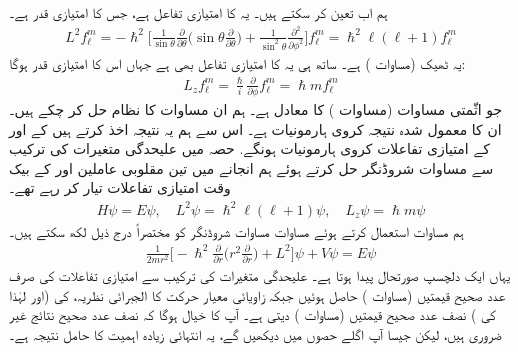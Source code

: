 ہم اب  تعین کر سکتے ہیں۔  یہ  کا امتیازی تفاعل ہے،  جس کا  امتیازی قدر  ہے۔
\begin{align*}
L^2 f_{\ell}^m = - \hslash^2 \big [ \frac{1}{\sin \theta} \frac{\partial}{\partial \theta} \big ( \sin \theta \frac{\partial}{\partial \theta} \big ) + \frac{1}{\sin^2 \theta} \frac{\partial^2}{\partial \phi^2} \big ] f_{\ell}^m = \hslash^2 \ell (\ell + 1) f_{\ell}^m
\end{align*}
یہ ٹھیک (مساوات  )  ہے۔ ساتھ ہی یہ  کا امتیازی تفاعل بھی ہے جہاں اس کا امتیازی قدر  ہوگا: 
\begin{align*}
L_z f_{\ell}^m = \frac{\hslash}{i} \frac{\partial}{\partial \phi} f_{\ell}^m = \hslash m f_{\ell}^m
\end{align*}
جو اثّمتی  مساوات (مساوات )  کا معادل ہے۔ ہم ان مساوات کا نظام حل کر چکے ہیں۔ ان کا معمول شدہ نتیجہ کروی ہارمونیات  ہے۔  اس سے ہم یہ نتیجہ اخذ کرتے ہیں کے  اور  کے امتیازی تفاعلات کروی ہارمونیات ہونگے. حصہ   میں علیحدگی متغیرات کی ترکیب سے مساوات شروڈنگر حل کرتے ہوئے ہم  انجانے میں تین مقلوبی عاملین   اور  کے بیک وقت امتیازی تفاعلات تیار کر رہے تھے۔ 
\begin{align}
H \psi = E \psi , \quad L^2 \psi = \hslash^2 \ell (\ell + 1) \psi , \quad L_z \psi = \hslash m \psi
\end{align}
ہم مساوات   استعمال کرتے ہوئے مساوات مساوات شروڈنگر کو مختصراً  درج ذیل لکھ سکتے ہیں۔ 
\begin{align*}
\frac{1}{2m r^2} \big [ - \hslash^2 \frac{\partial}{\partial r} \big ( r^2 \frac{\partial}{\partial r} \big ) + L^2 \big ]  \psi + V \psi = E \psi
\end{align*}
یہاں ایک دلچسپ صورتحال پیدا ہوتا ہے۔ علیحدگی متغیرات کی ترکیب سے امتیازی تفاعلات کی صرف عدد صحیح  قیمتیں (مساوات )  حاصل ہوئیں جبکہ زاویائی معیار حرکت کا الجبرائی نظریہ،   کی (اور لہٰذا  کی )   نصف عدد صحیح قیمتیں (مساوات )  دیتی ہے۔ آپ کا خیال ہوگا کہ نصف عدد صحیح نتائج غیر ضروری ہیں، لیکن جیسا آپ اگلے حصوں میں دیکھیں گے،  یہ انتہائی زیادہ اہمیت کا حامل نتیجہ  ہے۔ 

